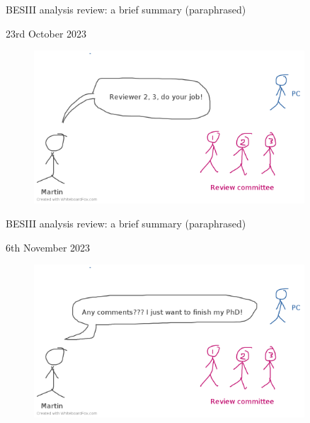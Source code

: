 \documentclass{beamer}
\begin{document}
\begin{frame}{BESIII analysis review: a brief summary (paraphrased)}
  \begin{center}
    {\large 23rd October 2023\phantom{p}}
  \end{center}
  \begin{figure}
    \includegraphics[width=0.9\textwidth,trim={0 0 0 0.5cm},clip=true]{Plots/BESIII_review_process_9.png}
  \end{figure}
\end{frame}

\begin{frame}{BESIII analysis review: a brief summary (paraphrased)}
  \begin{center}
    {\large 6th November 2023\phantom{p}}
  \end{center}
  \begin{figure}
    \includegraphics[width=0.9\textwidth,trim={0 0 0 0.5cm},clip=true]{Plots/BESIII_review_process_10.png}
  \end{figure}
\end{frame}
\end{document}
